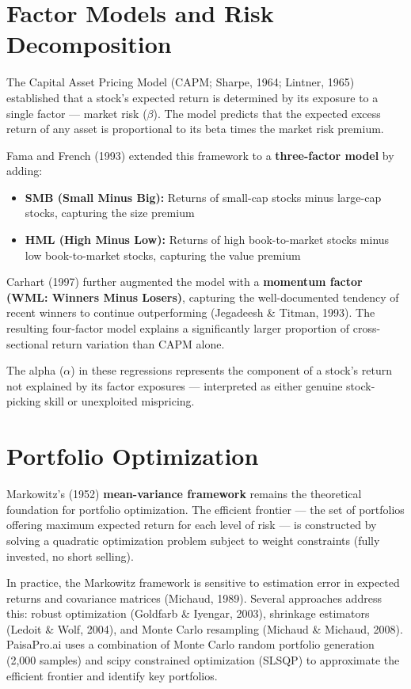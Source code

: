 \documentclass[12pt, a4paper, oneside]{report}
\newcommand{\projectname}{PaisaPro.ai}
\begin{document}
\section{Factor Models and Risk Decomposition}
\label{sec:lit_factors}

The Capital Asset Pricing Model (CAPM; Sharpe, 1964; Lintner, 1965) established that a stock's expected return is determined by its exposure to a single factor --- market risk ($\beta$). The model predicts that the expected excess return of any asset is proportional to its beta times the market risk premium.

Fama and French (1993) extended this framework to a \textbf{three-factor model} by adding:
\begin{itemize}[nosep]
    \item \textbf{SMB (Small Minus Big):} Returns of small-cap stocks minus large-cap stocks, capturing the size premium
    \item \textbf{HML (High Minus Low):} Returns of high book-to-market stocks minus low book-to-market stocks, capturing the value premium
\end{itemize}

Carhart (1997) further augmented the model with a \textbf{momentum factor (WML: Winners Minus Losers)}, capturing the well-documented tendency of recent winners to continue outperforming (Jegadeesh \& Titman, 1993). The resulting four-factor model explains a significantly larger proportion of cross-sectional return variation than CAPM alone.

The alpha ($\alpha$) in these regressions represents the component of a stock's return not explained by its factor exposures --- interpreted as either genuine stock-picking skill or unexploited mispricing.

\section{Portfolio Optimization}
\label{sec:lit_portfolio}

Markowitz's (1952) \textbf{mean-variance framework} remains the theoretical foundation for portfolio optimization. The efficient frontier --- the set of portfolios offering maximum expected return for each level of risk --- is constructed by solving a quadratic optimization problem subject to weight constraints (fully invested, no short selling).

In practice, the Markowitz framework is sensitive to estimation error in expected returns and covariance matrices (Michaud, 1989). Several approaches address this: robust optimization (Goldfarb \& Iyengar, 2003), shrinkage estimators (Ledoit \& Wolf, 2004), and Monte Carlo resampling (Michaud \& Michaud, 2008). \projectname{} uses a combination of Monte Carlo random portfolio generation (2,000 samples) and scipy constrained optimization (SLSQP) to approximate the efficient frontier and identify key portfolios.
\end{document}
